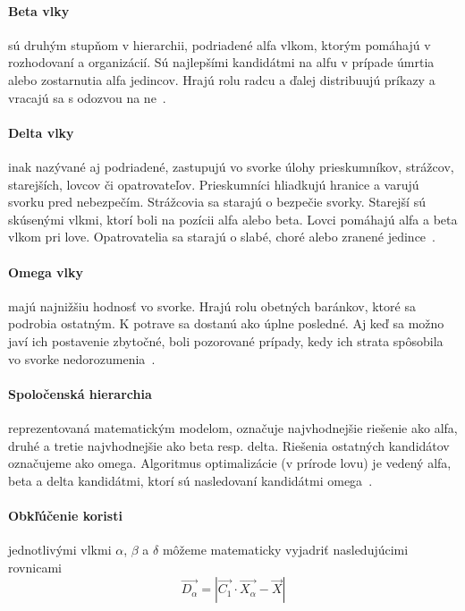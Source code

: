 \documentclass[a4paper,slovak,12pt,appendix]{article}
\begin{document}
\paragraph{Beta vlky} sú druhým stupňom v hierarchii, podriadené alfa vlkom,
ktorým pomáhajú v rozhodovaní a organizácií. Sú najlepšími kandidátmi na alfu
v prípade úmrtia alebo zostarnutia alfa jedincov. Hrajú rolu radcu a ďalej
distribuujú príkazy a vracajú sa s odozvou na ne~\cite{Seeley1991}.

\paragraph{Delta vlky} inak nazývané aj podriadené, zastupujú vo svorke
úlohy prieskumníkov, strážcov, starejších, lovcov či opatrovateľov.
Prieskumníci hliadkujú hranice a varujú svorku pred nebezpečím. Strážcovia
sa starajú o bezpečie svorky. Starejší sú skúsenými vlkmi, ktorí boli na pozícii
alfa alebo beta. Lovci pomáhajú alfa a beta vlkom pri love. Opatrovatelia sa
starajú o slabé, choré alebo zranené jedince~\cite{Seeley1991}.

\paragraph{Omega vlky} majú najnižšiu hodnosť vo svorke. Hrajú rolu obetných
baránkov, ktoré sa podrobia ostatným. K potrave sa dostanú ako úplne posledné.
Aj keď sa možno javí ich postavenie zbytočné, boli pozorované prípady, kedy ich
strata spôsobila vo svorke nedorozumenia~\cite{Seeley1991}.

\paragraph{Spoločenská hierarchia} reprezentovaná matematickým modelom,
označuje najvhodnejšie riešenie ako alfa, druhé a tretie najvhodnejšie ako beta
resp. delta. Riešenia ostatných kandidátov označujeme ako omega. Algoritmus
optimalizácie (v prírode lovu) je vedený alfa, beta a delta kandidátmi, ktorí
sú nasledovaní kandidátmi omega~\cite{Seeley1991}.

\paragraph{Obkľúčenie koristi} jednotlivými vlkmi $\alpha$, $\beta$ a $\delta$
môžeme matematicky vyjadriť nasledujúcimi rovnicami
\begin{equation}
  \vec{D_\alpha} = | \vec{C_1} \cdot \vec{X_\alpha} - \vec{X} |
  \label{eq-prey-alpha}
\end{equation}
\end{document}
